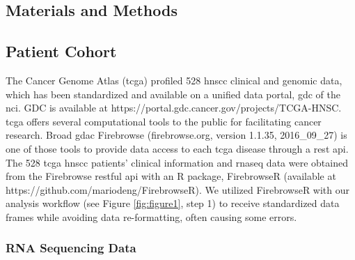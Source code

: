 \documentclass[cancers,article,submit,moreauthors,pdftex]{Definitions/mdpi}
\begin{document}
\begin{paracol}{2}
\section{Materials and Methods}

\subsection*{Patient Cohort} 

The Cancer Genome Atlas (\acrshort{tcga}) profiled 528 \acrshort{hnscc} clinical and genomic data, which has been standardized and available on a unified data portal, \acrfull{gdc} of the \acrfull{nci}.
GDC is available at https://portal.gdc.cancer.gov/projects/TCGA-HNSC.
\acrshort{tcga} offers several computational tools to the public for facilitating cancer research.
Broad \acrfull{gdac} Firebrowse (firebrowse.org, version 1.1.35, 2016\_09\_27) is one of those tools to provide data access to each \acrshort{tcga} disease through a \acrfull{rest} \acrfull{api}.
The 528 \acrshort{tcga} \acrshort{hnscc} patients' clinical information and \acrshort{rnaseq} data were obtained from the Firebrowse \acrshort{rest}ful \acrshort{api} with an R package, FirebrowseR (available at https://github.com/mariodeng/FirebrowseR)\cite{Deng2017}. 
We utilized FirebrowseR with our analysis workflow (see Figure \ref{fig:figure1}, step 1) to receive standardized data frames while avoiding data re-formatting, often causing some errors.

\subsubsection*{RNA Sequencing Data} 


\end{paracol}
\end{document}

